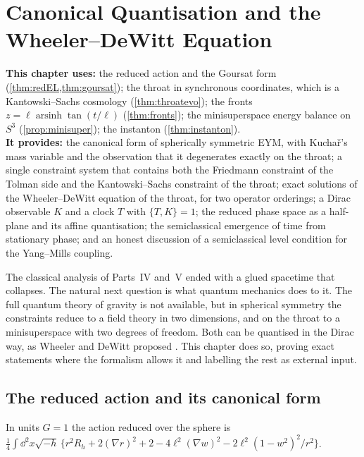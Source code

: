 \chapter{Canonical Quantisation and the Wheeler--DeWitt Equation}
\label{ch:wdw}

\begin{usesbox}
\textbf{This chapter uses:} the reduced action and the Goursat form (\cref{thm:redEL,thm:goursat}); the throat in synchronous coordinates, which is a Kantowski--Sachs cosmology (\cref{thm:throatevo}); the fronts $z=\ell\operatorname{arsinh}\tan(t/\ell)$ (\cref{thm:fronts}); the minisuperspace energy balance on $S^3$ (\cref{prop:minisuper}); the instanton (\cref{thm:instanton}).\\
\textbf{It provides:} the canonical form of spherically symmetric EYM, with Kucha\v{r}'s mass variable and the observation that it degenerates exactly on the throat; a single constraint system that contains both the Friedmann constraint of the Tolman side and the Kantowski--Sachs constraint of the throat; exact solutions of the Wheeler--DeWitt equation of the throat, for two operator orderings; a Dirac observable $K$ and a clock $T$ with $\{T,K\}=1$; the reduced phase space as a half-plane and its affine quantisation; the semiclassical emergence of time from stationary phase; and an honest discussion of a semiclassical level condition for the Yang--Mills coupling.
\end{usesbox}

The classical analysis of Parts~IV and~V ended with a glued spacetime that collapses. The natural next question is what quantum mechanics does to it. The full quantum theory of gravity is not available, but in spherical symmetry the constraints reduce to a field theory in two dimensions, and on the throat to a minisuperspace with two degrees of freedom. Both can be quantised in the Dirac way, as Wheeler and DeWitt proposed \cite{DeWitt1967}. This chapter does so, proving exact statements where the formalism allows it and labelling the rest as external input.

\section{The reduced action and its canonical form}

In units $G=1$ the action reduced over the sphere is $\frac14\int\dd^2x\sqrt{-h}\,\{r^2R_h+2(\nabla r)^2+2-4\ell^2(\nabla w)^2-2\ell^2(1-w^2)^2/r^2\}$.

